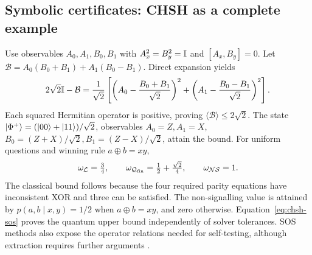 \subsection{Symbolic certificates: CHSH as a complete example}
Use observables $A_0,A_1,B_0,B_1$ with $A_x^2=B_y^2=\mathbb I$ and
$[A_x,B_y]=0$. Let
$\mathcal B=A_0(B_0+B_1)+A_1(B_0-B_1)$. Direct expansion yields
\begin{equation}
 2\sqrt2\mathbb I-\mathcal B
 =\frac1{\sqrt2}\left[
 \left(A_0-\frac{B_0+B_1}{\sqrt2}\right)^2+
 \left(A_1-\frac{B_0-B_1}{\sqrt2}\right)^2\right].
 \label{eq:chsh-sos}
\end{equation}
Each squared Hermitian operator is positive, proving
$\langle\mathcal B\rangle\leq2\sqrt2$. The state
$\lvert \Phi^+\rangle=(\lvert 00\rangle+\lvert 11\rangle)/\sqrt2$, observables $A_0=Z,A_1=X$,
$B_0=(Z+X)/\sqrt2,B_1=(Z-X)/\sqrt2$, attain the bound. For uniform questions
and winning rule $a\oplus b=xy$,
\[
 \omega_{\mathcal L}=\tfrac34,\qquad
 \omega_{\mathcal Q_{\rm fin}}=\tfrac12+\tfrac{\sqrt2}{4},\qquad
 \omega_{\mathcal{NS}}=1.
\]
The classical bound follows because the four required parity equations have
inconsistent XOR and three can be satisfied. The non-signalling value is
attained by $p(a,b\mid x,y)=1/2$ when $a\oplus b=xy$, and zero otherwise.
Equation~\eqref{eq:chsh-sos} proves the quantum upper bound independently of
solver tolerances. SOS methods also expose the operator relations needed for
self-testing, although extraction requires further arguments
\cite{bamps2015}.

